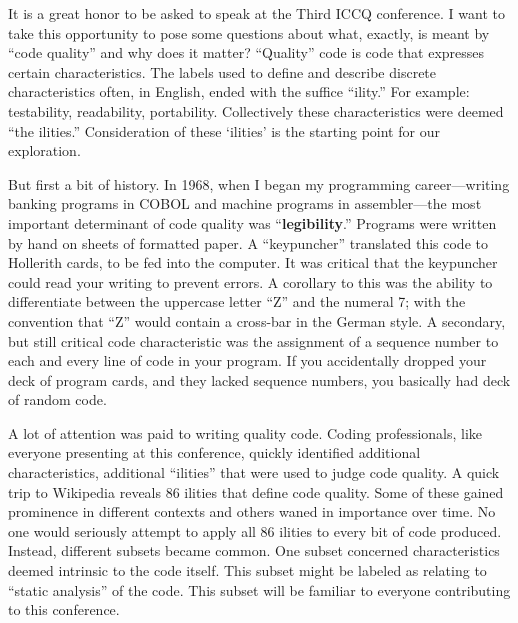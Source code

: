 \cleardoublepage
{}

It is a great honor to be asked to speak at the Third ICCQ conference. I want to take this
opportunity to pose some questions about what, exactly, is meant by ``code quality'' and why does it matter?
``Quality'' code is code that expresses certain characteristics. The labels used to define
and describe discrete characteristics often, in English, ended with the suffice ``ility.''
For example: testability, readability, portability. Collectively these characteristics were
deemed ``the ilities.'' Consideration of these ‘ilities’ is the starting point for our exploration.

But first a bit of history. In 1968, when I began my programming career—writing banking programs in COBOL and machine programs in assembler—the most important determinant of code quality was ``\textbf{legibility}.''
Programs were written by hand on sheets of formatted paper. A ``keypuncher'' translated this code to Hollerith cards, to be fed into the computer. It was critical that the keypuncher  could read your writing to prevent errors. A corollary to this was the ability to differentiate between the uppercase letter ``Z'' and the numeral 7; with the convention that ``Z'' would contain a cross-bar in the German style.
A secondary, but still critical code characteristic was the assignment of a sequence number to each and every
line of code in your program. If you accidentally dropped your deck of program cards, and
they lacked sequence numbers, you basically had deck of random code.

A lot of attention was paid to writing quality code. Coding professionals, like everyone presenting at this conference, quickly identified additional characteristics, additional ``ilities'' that were used to judge code quality. A quick trip to Wikipedia reveals 86 ilities that define code quality. Some of these gained prominence in different contexts and others waned in importance over time.
No one would seriously attempt to apply all 86 ilities to every bit of code produced. Instead, different subsets became common. One subset concerned characteristics deemed intrinsic to the code itself. This subset might be labeled as relating to ``static analysis'' of the code. This subset will be familiar to everyone contributing to this conference.

